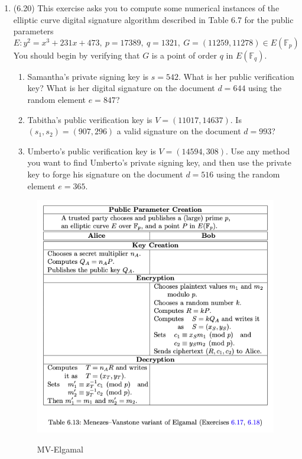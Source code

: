 \documentclass[12pt]{amsart}
\theoremstyle{definition}
\begin{document}
\begin{enumerate}
	\item (6.20) This exercise asks you to compute some numerical 
		instances of the elliptic curve digital signature algorithm 
		described in Table 6.7 for the public parameters 
	\begin{displaymath}
		E: y^2 = x^3 + 231x + 473,~ p = 17389,~ q = 1321,~ 
		G = (11259,11278) \in E(\mathbb{F}_p)
	\end{displaymath}
		You should begin by verifying that $G$ is a point of 
		order $q$ in $E(\mathbb{F}_q)$. 
	\begin{enumerate}
		\item Samantha's private signing key is $s=542$. What is her 
			public verification key? What is her digital 
			signature on the document $d = 644$ using the 
			random element $e=847$? 
		\item Tabitha's public verification key is $V = (11017,14637)$. 
			Is $(s_1,s_2) = (907,296)$ a valid signature on the 
			document $d=993$?
		\item Umberto's public verification key is $V = (14594,308)$. 
			Use any method you want to find Umberto's private signing 
			key, and then use the private key to forge his 
			signature on the document $d=516$ using the random 
			element $e=365$. 
	\end{enumerate}
	\begin{center}
	\begin{figure}[ht] 
		\caption{MV-Elgamal}
		\includegraphics[width=6.5in]{mv-elgamal.png}
		\label{fig:mv}
	\end{figure}
	\end{center}
\end{enumerate}
\end{document}
